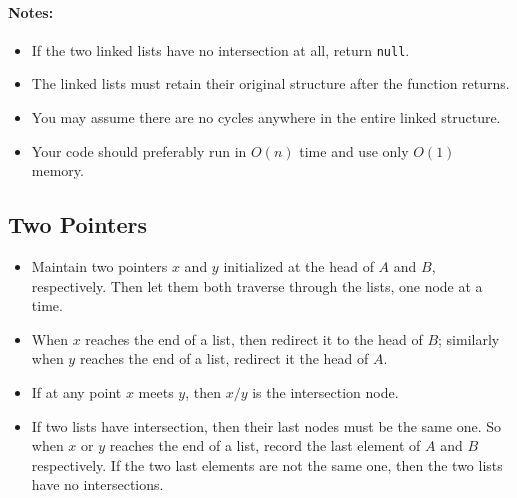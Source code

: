 \paragraph{Notes:}
\begin{itemize}
\item If the two linked lists have no intersection at all, return \texttt{null}.
\item The linked lists must retain their original structure after the function returns.
\item You may assume there are no cycles anywhere in the entire linked structure.
\item Your code should preferably run in $O(n)$ time and use only $O(1)$ memory.
\end{itemize}
\subsection{Two Pointers}
\begin{itemize}
\item Maintain two pointers $x$ and $y$ initialized at the head of $A$ and $B$, respectively. Then let them both traverse through the lists, one node at a time.
\item When $x$ reaches the end of a list, then redirect it to the head of $B$; similarly when $y$ reaches the end of a list, redirect it the head of $A$.
\item If at any point $x$ meets $y$, then $x/y$ is the intersection node.
\item If two lists have intersection, then their last nodes must be the same one. So when $x$ or $y$ reaches the end of a list, record the last element of $A$ and $B$ respectively. If the two last elements are not the same one, then the two lists have no intersections.
\end{itemize}
\setcounter{lstlisting}{0}
